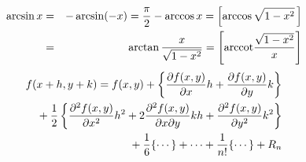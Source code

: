 \documentclass{article}
\begin{document}
\setcounter{equation}{5}
\begin{eqnarray}
\arcsin x & = & -\arcsin(-x) = \frac{\pi}{2} - \arccos x = 
	       \left[\arccos\sqrt{1-x^2}\,\right]\nonumber\\
	  & = & \arctan\frac{x}{\sqrt{1-x^2}} =
	       \left[\mbox{\rm arccot}\frac{\sqrt{1-x^2}}{x}\right]
\end{eqnarray}
\begin{eqnarray}
\lefteqn{f(x+h,y+k) = f(x,y) + \left\{\frac{\partial f(x,y)}{\partial x}h +
    \frac{\partial f(x,y)}{\partial y}k\right\}}\nonumber\\
    &&\mbox{} + \frac{1}{2}\left\{\frac{\partial^2f(x,y)}{\partial x^2}h^2
      + 2\frac{\partial^2f(x,y)}{\partial x\partial y}kh
      +  \frac{\partial^2f(x,y)}{\partial y^2}k^2\right\}\\
    &&\mbox{} + \frac{1}{6}\{\cdots\} + \cdots + \frac{1}{n!}\{\cdots\} + R_n
    \nonumber
\end{eqnarray}
\end{document}
